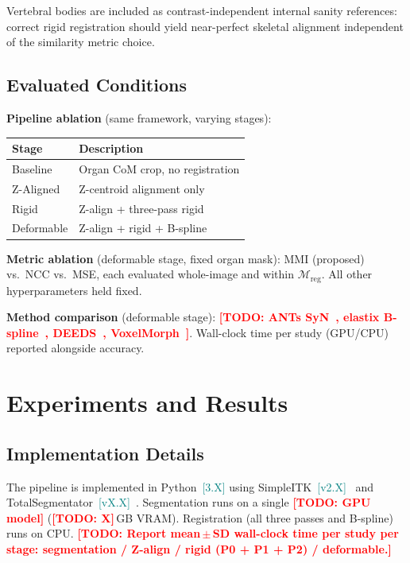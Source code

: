\documentclass[10pt,twocolumn]{article}
\newcommand{\TODO}[1]{\textcolor{red}{\textbf{[TODO: #1]}}}
\newcommand{\NUM}[1]{\textcolor{teal}{[#1]}}
\newcommand{\Mreg}{\mathcal{M}_{\text{reg}}}
\begin{document}
Vertebral bodies are included as contrast-independent internal
sanity references: correct rigid registration should yield near-perfect
skeletal alignment independent of the similarity metric choice.

\subsection{Evaluated Conditions}

\textbf{Pipeline ablation} (same framework, varying stages):

\begin{center}
\small
\begin{tabular}{ll}
\toprule
\textbf{Stage} & \textbf{Description} \\
\midrule
Baseline   & Organ CoM crop, no registration \\
Z-Aligned  & Z-centroid alignment only \\
Rigid      & Z-align + three-pass rigid \\
Deformable & Z-align + rigid + B-spline \\
\bottomrule
\end{tabular}
\end{center}

\textbf{Metric ablation} (deformable stage, fixed organ mask):
MMI (proposed) vs.\ NCC vs.\ MSE, each evaluated whole-image and
within $\Mreg$. All other hyperparameters held fixed.

\textbf{Method comparison} (deformable stage):
\TODO{ANTs SyN~\cite{avants2008}, elastix B-spline~\cite{klein2010},
DEEDS~\cite{heinrich2013}, VoxelMorph~\cite{balakrishnan2019}}.
Wall-clock time per study (GPU/CPU) reported alongside accuracy.

\section{Experiments and Results}
\label{sec:results}

\subsection{Implementation Details}
\label{sec:impl}

The pipeline is implemented in Python~\NUM{3.X} using
SimpleITK~\NUM{v2.X}~\cite{lowekamp2013} and
TotalSegmentator~\NUM{vX.X}~\cite{wasserthal2023}.
Segmentation runs on a single \TODO{GPU model} (\TODO{X}\,GB VRAM).
Registration (all three passes and B-spline) runs on CPU.
\TODO{Report mean\,$\pm$\,SD wall-clock time per study per stage:
segmentation / Z-align / rigid (P0 + P1 + P2) / deformable.}
\end{document}

